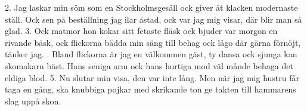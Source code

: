 \begin{multicols}{2}
2.  Jag laskar min söm som en Stockholmsgesäll
    ock giver åt klacken modernaste ställ.
    Ock sen på beställning jag ilar åstad,
    ock var jag mig visar, där blir man så glad.
3.  Ock matmor hon kokar sitt fetaste fläsk
    ock bjuder var morgon en rivande bäsk,
    ock flickorna bädda min säng till behag
    ock lågo där gärna förnöjt, tänker jag.
\vfill{}.  Bland flickorna är jag en välkommen gäst,
    ty dansa ock sjunga kan skomakarn bäst.
    Hans seniga arm ock hans hurtiga mod
    väl månde behaga det eldiga blod.
5.  Nu slutar min visa, den var inte lång.
    Men när jag mig hustru får taga en gång,
    ska knubbiga pojkar med skrikande ton
    ge takten till hammarens slag uppå skon.
\end{multicols}
